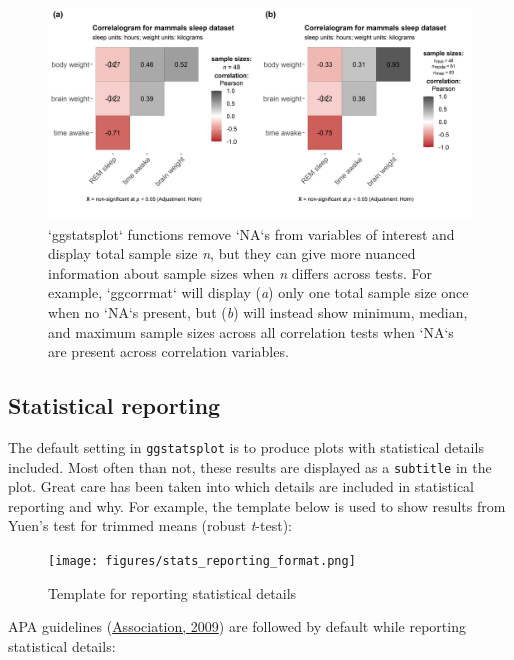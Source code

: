 \documentclass[
]{article}
\begin{document}
\begin{figure}[H]
\includegraphics[width=1\linewidth]{./figures/paper-fig4-1} \caption{`ggstatsplot` functions remove `NA`s from variables of interest and display total sample size \textit{n}, but they can give more nuanced information about sample sizes when \textit{n} differs across tests. For example, `ggcorrmat` will display (\textit{a}) only one total sample size once when no `NA`s present, but (\textit{b}) will instead show minimum, median, and maximum sample sizes across all correlation tests when `NA`s are present across correlation variables.}\label{fig:fig4}
\end{figure}

\hypertarget{statistical-reporting}{%
\subsection{Statistical reporting}\label{statistical-reporting}}

The default setting in \texttt{ggstatsplot} is to produce plots with statistical
details included. Most often than not, these results are displayed as a \texttt{subtitle}
in the plot. Great care has been taken into which details are included in
statistical reporting and why. For example, the template below is used to show
results from Yuen's test for trimmed means (robust \emph{t}-test):

\begin{figure}
\centering
\texttt{[image: figures/stats\_reporting\_format.png]}
\caption{Template for reporting statistical details}
\end{figure}

APA guidelines (\protect\hyperlink{ref-associationPublicationManualAmerican2009}{Association, 2009}) are followed by
default while reporting statistical details:
\end{document}
